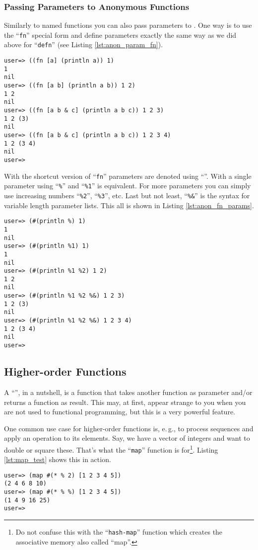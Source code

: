 \subsubsection{Passing Parameters to Anonymous Functions}
Similarly to named functions you can also pass parameters to .
One way is to use the ``\texttt{fn}'' special form and define parameters exactly the same way as we did above for ``\texttt{defn}'' (see Listing \vref{lst:anon_param_fn}).

\begin{lstlisting}[label=lst:anon_param_fn, caption=Anonymous Function and Parameters via ``\texttt{fn}'']
user=> ((fn [a] (println a)) 1)
1
nil
user=> ((fn [a b] (println a b)) 1 2)
1 2
nil
user=> ((fn [a b & c] (println a b c)) 1 2 3)
1 2 (3)
nil
user=> ((fn [a b & c] (println a b c)) 1 2 3 4)
1 2 (3 4)
nil
user=>  
\end{lstlisting}

With the shortcut version of ``\texttt{fn}'' parameters are denoted using ``\bfix{\%}''.
With a single parameter using ``\texttt{\%}'' and ``\texttt{\%1}'' is equivalent.
For more parameters you can simply use increasing numbers ``\texttt{\%2}'', ``\texttt{\%3}'', etc.
Last but not least, ``\texttt{\%\&}'' is the syntax for variable length parameter lists.
This all is shown in Listing \vref{lst:anon_fn_params}.

\begin{lstlisting}[label=lst:anon_fn_params, caption=Anonymous Function and Parameter via Shortcut]
user=> (#(println %) 1)
1
nil
user=> (#(println %1) 1)
1
nil
user=> (#(println %1 %2) 1 2)
1 2
nil
user=> (#(println %1 %2 %&) 1 2 3)
1 2 (3)
nil
user=> (#(println %1 %2 %&) 1 2 3 4)
1 2 (3 4)
nil
user=>  
\end{lstlisting}

\subsection{Higher-order Functions}
A ``'', in a nutshell, is a function that takes another function as parameter and/or returns a function as result.
This may, at first, appear strange to you when you are not used to functional programming, but this is a very powerful feature.

One common use case for higher-order functions is, e.\,g., to process sequences and apply an operation to its elements.
Say, we have a vector of integers and want to double or square these.
That's what the ``\texttt{map}'' function is for\footnote{Do not confuse this with the ``\texttt{hash-map}'' function which creates the associative memory also called ``map''.}.
Listing \vref{lst:map_test} shows this in action.

\begin{lstlisting}[label=lst:map_test, caption=Using the Higher-order function ``\texttt{map}'' to Process a Sequence]
user=> (map #(* % 2) [1 2 3 4 5])
(2 4 6 8 10)
user=> (map #(* % %) [1 2 3 4 5])
(1 4 9 16 25)
user=> 
\end{lstlisting}







